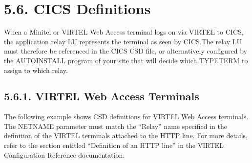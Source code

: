 \documentclass[letterpaper,10pt,english]{sphinxmanual}
\begin{document}


\section{5.6. CICS Definitions}
\label{\detokenize{Installation_Guide:cics-definitions}}
When a Minitel or VIRTEL Web Access terminal logs on via VIRTEL to CICS, the application relay LU represents the terminal as seen by CICS.The relay LU must therefore be referenced in the CICS CSD file, or alternatively configured by the AUTOINSTALL program of your site that will decide which TYPETERM to assign to which relay.


\subsection{5.6.1. VIRTEL Web Access Terminals}
\label{\detokenize{Installation_Guide:virtel-web-access-terminals}}
The following example shows CSD definitions for VIRTEL Web Access terminals. The NETNAME parameter must match the “Relay” name specified in the definition of the VIRTEL terminals attached to the HTTP line. For more details, refer to the section entitled “Definition of an HTTP line” in the VIRTEL Configuration Reference documentation.

\begin{sphinxVerbatim}[commandchars=\\\{\}]
     
   
       
          
   
       
          
   
       
          
   
       
          
\end{sphinxVerbatim}
\end{document}
